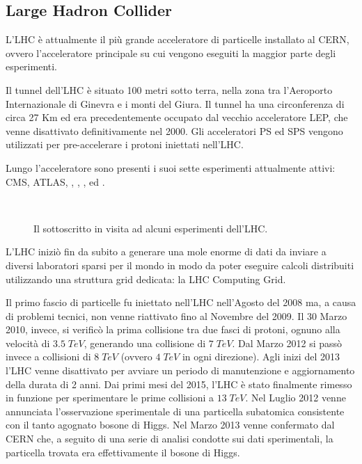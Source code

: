 		\subsection{Large Hadron Collider} \label{subsec:C;a;LHC}
			
			L'\ac{LHC} è attualmente il più grande acceleratore di particelle installato al \ac{CERN}, ovvero l'acceleratore principale su cui vengono eseguiti la maggior parte degli esperimenti.
			
			Il tunnel dell'\ac{LHC} è situato 100 metri sotto terra, nella zona tra l'Aeroporto Internazionale di Ginevra e i monti del Giura. Il tunnel ha una circonferenza di circa 27 Km ed era precedentemente occupato dal vecchio acceleratore \ac{LEP}, che venne disattivato definitivamente nel 2000. Gli acceleratori \ac{PS} ed \ac{SPS} vengono utilizzati per pre-accelerare i protoni iniettati nell'\ac{LHC}.
			
			Lungo l'acceleratore sono presenti i suoi sette esperimenti attualmente attivi: \ac{CMS}, \ac{ATLAS}, , , ,  ed .
			
			\begin{figure}[h!]
				\begin{center}
					~
				\end{center}
				\caption[Visita all'LHC]{Il sottoscritto in visita ad alcuni esperimenti dell'LHC.}
				\label{fig:visita_lhc}
			\end{figure}
			
			L'\ac{LHC} iniziò fin da subito a generare una mole enorme di dati da inviare a diversi laboratori sparsi per il mondo in modo da poter eseguire calcoli distribuiti utilizzando una struttura grid dedicata: la LHC Computing Grid.
			
			Il primo fascio di particelle fu iniettato nell'\ac{LHC} nell'Agosto del 2008 ma, a causa di problemi tecnici, non venne riattivato fino al Novembre del 2009. Il 30 Marzo 2010, invece, si verificò la prima collisione tra due fasci di protoni, ognuno alla velocità di $3.5 \; TeV$, generando una collisione di $7 \; TeV$. Dal Marzo 2012 si passò invece a collisioni di $8 \; TeV$ (ovvero $4 \; TeV$ in ogni direzione). Agli inizi del 2013 l'\ac{LHC} venne disattivato per avviare un periodo di manutenzione e aggiornamento della durata di 2 anni. Dai primi mesi del 2015, l'\ac{LHC} è stato finalmente rimesso in funzione per sperimentare le prime collisioni a $13 \; TeV$. Nel Luglio 2012 venne annunciata l'osservazione sperimentale di una particella subatomica consistente con il tanto agognato bosone di Higgs. Nel Marzo 2013 venne confermato dal \ac{CERN} che, a seguito di una serie di analisi condotte sui dati sperimentali, la particella trovata era effettivamente il bosone di Higgs.
	
